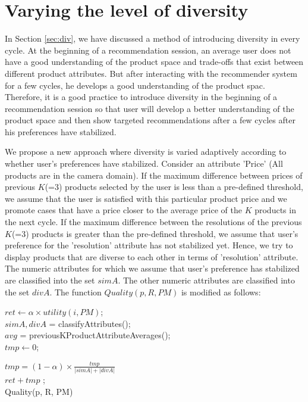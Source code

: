 \section{Varying the level of diversity}
In Section \ref{sec:div}, we have discussed a method of introducing diversity in every cycle.
At the beginning of a recommendation session, an average user does not have a good understanding of the product space and trade-offs that exist between different product attributes.
But after interacting with the recommender system for a few cycles, he develops a good understanding of the product spac.
Therefore, it is a good practice to introduce diversity in the beginning of a recommendation session so that user will develop a better understanding of the product space and then show targeted recommendations after a few cycles after his preferences have stabilized.

We propose a new approach where diversity is varied adaptively according to whether user's preferences have stabilized.
Consider an attribute 'Price' (All products are in the camera domain).
If the maximum difference between prices of previous $K$(=3) products selected by the user is less than a pre-defined threshold, we assume that the user is satisfied with this particular product price and we promote cases that have a price closer to the average price of the $K$ products in the next cycle.
If the maximum difference between the resolutions of the previous $K$(=3) products is greater than the pre-defined threshold, we assume that user's preference for the 'resolution' attribute has not stabilized yet. 
Hence, we try to display products that are diverse to each other in terms of 'resolution' attribute.
The numeric attributes for which we assume that user's preference has stabilized are classified into the set $simA$.
The other numeric attributes are classified into the set $divA$.
The function $Quality(p, R, PM)$ is modified as follows:

\begin{algorithm}[ht]
  \DontPrintSemicolon

  $ret \gets \alpha \times utility(i, PM)$; \\
  $simA, divA$ = classifyAttributes(); \\
  $avg$ = previousKProductAttributeAverages(); \\
  $tmp \gets 0$;\\

  $tmp = (1-\alpha) \times \frac{tmp} {\lvert simA\rvert + \lvert divA\rvert}$\\
  \Return $ret + tmp$ ;\\
  \caption{Quality(p, R, PM)}
  \label{algo:quality2}
\end{algorithm}


